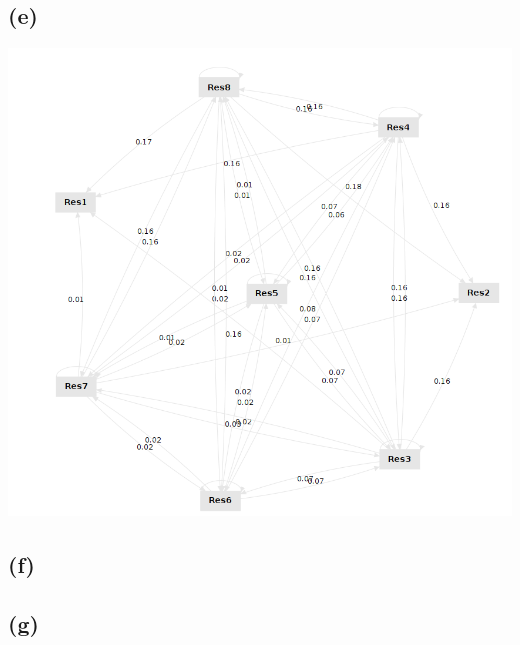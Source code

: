 \documentclass[../../main.tex]{subfiles}
\begin{document}
\subsection*{(e)}
\includegraphics[width=\columnwidth]{img/RapidMiner_e_Graph.png}

\subsection*{(f)}

\subsection*{(g)}
\end{document}
